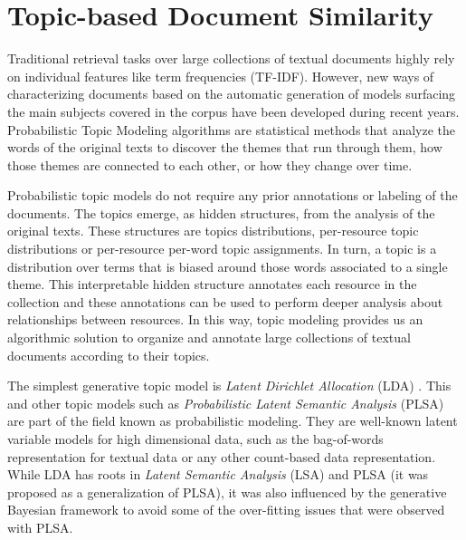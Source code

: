 \section{Topic-based Document Similarity}
Traditional retrieval tasks over large collections of textual documents \cite{Hearst1999} highly rely on individual features like term frequencies (TF-IDF). However, new ways of characterizing documents based on the automatic generation of models surfacing the main subjects covered in the corpus have been developed during recent years. Probabilistic Topic Modeling \cite{Blei2010} algorithms are statistical methods that analyze the words of the original texts to discover the themes that run through them, how those themes are connected to each other, or how they change over time.

Probabilistic topic models do not require any prior annotations or labeling of the documents. The topics emerge, as hidden structures, from the analysis of the original texts. These structures are topics distributions, per-resource topic distributions or per-resource per-word topic assignments. In turn, a topic is a distribution over terms that is biased around those words associated to a single theme. This interpretable hidden structure annotates each resource in the collection and these annotations can be used to perform deeper analysis about relationships between resources. In this way, topic modeling provides us an algorithmic solution to organize and annotate large collections of textual documents according to their topics.

The simplest generative topic model is \textit{Latent Dirichlet Allocation} (LDA) \cite{Blei2003}. This and other topic models such as \textit{Probabilistic Latent Semantic Analysis} (PLSA) \cite{Hofmann2001} are part of the field known as probabilistic modeling. They are well-known latent variable models for high dimensional data, such as the bag-of-words representation for textual data or any other count-based data representation. While LDA has roots in \textit{Latent Semantic Analysis} (LSA) \cite{Deerwester1990} and PLSA (it was proposed as a generalization of PLSA), it was also influenced by the generative Bayesian framework to avoid some of the over-fitting issues that were observed with PLSA.

